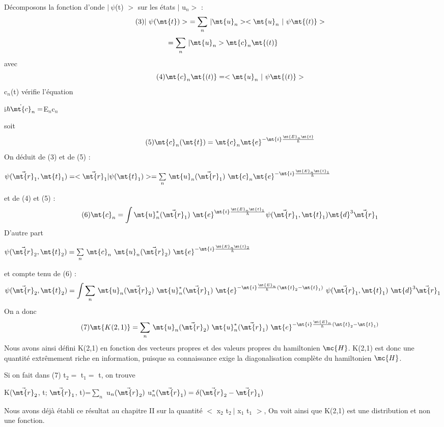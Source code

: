 Décomposons la fonction d'onde $|\ \psi$(t) $>$ sur les états  $|$ u$_n>$ :
\[
\tag{3}|\ \psi(\mt{t})>\ = \underset{n}{\sum}\ | \mt{u}_n>< \mt{u}_n\ |\ \psi\mt{(t)}>
\]
\[
=\underset{n}{\sum}\ | \mt{u}_n>\mt{c}_n\mt{(t)}
\]
avec
\[
\tag{4}\mt{c}_n\mt{(t)}=< \mt{u}_n\ |\ \psi\mt{(t)}>
\]
c$_n$(t) vérifie l'équation
\begin{center}
i$\hbar\dot{\mt{c}}_n = $E$_n$c$_n$
\end{center}
soit
\[
\tag{5}\mt{c}_n(\mt{t})=\mt{c}_n\mt{ e}^{-\mt{i}\frac{\mt{E}_n\mt{t}}{\hbar}}
\]
On déduit de (3) et de (5) :
\begin{center}
$\psi(\vec{\mt{r}}_1,\mt{t}_1)=<\vec{\mt{r}}_1|\psi(\mt{t}_1)>=
\underset{n}{\sum}\ \mt{u}_n(\vec{\mt{r}}_1)\ \mt{c}_n\mt{ e}^{-\mt{i}\frac{\mt{E}_n\mt{t}_1}{\hbar}}$
\end{center}
et de (4) et (5) :
\[
\tag{6}\mt{c}_n=\int\mt{u}_n^*(\vec{\mt{r}}_1)\ \mt{ e}^{\mt{i}\frac{\mt{E}_n\mt{t}_1}{\hbar}}
\psi(\vec{\mt{r}}_1,\mt{t}_1)\mt{d}^3\vec{\mt{r}}_1
\]
D'autre part
\begin{center}
$\psi(\vec{\mt{r}}_2,\mt{t}_2)=
\underset{n}{\sum}\ \mt{c}_n\ \mt{u}_n(\vec{\mt{r}}_2)\ \mt{ e}^{-\mt{i}\frac{\mt{E}_n\mt{t}_2}{\hbar}}$
\end{center}
et compte tenu de (6) : 
\[
\psi(\vec{\mt{r}}_2,\mt{t}_2)=\int
\underset{n}{\sum}\ \mt{u}_n(\vec{\mt{r}}_2)\ \mt{u}_n^*(\vec{\mt{r}}_1)\ \mt{ e}^{-\mt{i}
\frac{\mt{E}_n}{\hbar}(\mt{t}_2-\mt{t}_1)}\ \psi(\vec{\mt{r}}_1,\mt{t}_1)\ \mt{d}^3\vec{\mt{r}}_1
\]
On a donc
\[
\tag{7}\mt{K(2,1)}=\underset{n}{\sum}\ \mt{u}_n(\vec{\mt{r}}_2)\ \mt{u}_n^*(\vec{\mt{r}}_1)\ \mt{ e}^{-\mt{i}
\frac{\mt{E}_n}{\hbar}(\mt{t}_2-\mt{t}_1)}
\]
Nous avons ainsi défini K(2,1) en fonction des vecteurs propres et
des valeurs propres du hamiltonien $\mc{H}$. K(2,1) est donc une quantité
extrêmement riche en information, puisque sa connaissance exige la diagonalisation complète du hamiltonien $\mc{H}$.

Si on fait dans (7) t$_2=$ t$_1=$ t, on trouve
\begin{center}
K($\vec{\mt{r}}_2$, t; $\vec{\mt{r}}_1$, t)=$\underset{n}{\sum}$ u$_n(\vec{\mt{r}}_2)$ u$_n^*(\vec{\mt{r}}_1)=
\delta(\vec{\mt{r}}_2-\vec{\mt{r}}_1)$
\end{center}
Nous avons déjà établi ce résultat au chapitre II sur la quantité
$<$ x$_2$ t$_2\ |$ x$_1$ t$_1$ $>$, On voit ainsi que K(2,1) est une distribution et non
une fonction.

